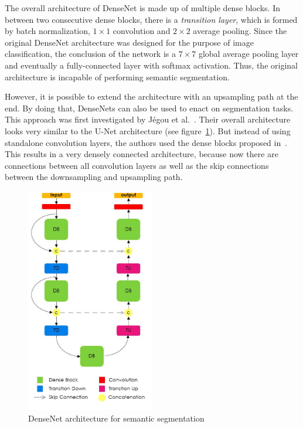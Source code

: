 The overall architecture of DenseNet is made up of multiple dense blocks. In between two consecutive dense blocks, there is a \emph{transition layer}, which is formed by batch normalization, $1\times 1$ convolution and $2\times 2$ average pooling. Since the original DenseNet architecture was designed for the purpose of image classification, the conclusion of the network is a $7\times 7$ global average pooling layer and eventually a fully-connected layer with softmax activation. Thus, the original architecture is incapable of performing semantic segmentation.

However, it is possible to extend the architecture with an upsampling path at the end. By doing that, DenseNets can also be used to enact on segmentation tasks. This approach was first investigated by Jégou et al.~\cite{denseseg17}. Their overall architecture looks very similar to the U-Net architecture (see figure~\ref{fig:densenet_segmentation}). But instead of using standalone convolution layers, the authors used the dense blocks proposed in~\cite{densenet18}. This results in a very densely connected architecture, because now there are connections between all convolution layers as well as the skip connections between the downsampling and upsampling path.

\begin{figure}[h]
    \centering
    \includegraphics[width=0.5\textwidth]{images/dense_segmentation_architecture}
    \caption{DenseNet architecture for semantic segmentation~\cite{denseseg17}}
    \label{fig:densenet_segmentation}
\end{figure}

